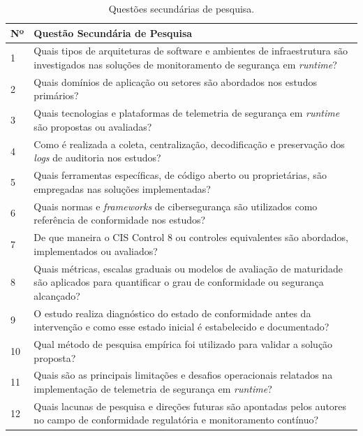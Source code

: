 \begin{table}[!htbp]
    \centering
    \caption{Questões secundárias de pesquisa.}
    \label{tab:rsl_questoes_secundarias}
    \small
    \begin{tabular}{p{1.2cm}p{13.2cm}}
        \hline
        \textbf{Nº} & \textbf{Questão Secundária de Pesquisa} \\ \hline
        1 & Quais tipos de arquiteturas de software e ambientes de infraestrutura são investigados nas soluções de monitoramento de segurança em \textit{runtime}? \\ \hline
        2 & Quais domínios de aplicação ou setores são abordados nos estudos primários? \\ \hline
        3 & Quais tecnologias e plataformas de telemetria de segurança em \textit{runtime} são propostas ou avaliadas? \\ \hline
        4 & Como é realizada a coleta, centralização, decodificação e preservação dos \textit{logs} de auditoria nos estudos? \\ \hline
        5 & Quais ferramentas específicas, de código aberto ou proprietárias, são empregadas nas soluções implementadas? \\ \hline
        6 & Quais normas e \textit{frameworks} de cibersegurança são utilizados como referência de conformidade nos estudos? \\ \hline
        7 & De que maneira o CIS Control 8 ou controles equivalentes são abordados, implementados ou avaliados? \\ \hline
        8 & Quais métricas, escalas graduais ou modelos de avaliação de maturidade são aplicados para quantificar o grau de conformidade ou segurança alcançado? \\ \hline
        9 & O estudo realiza diagnóstico do estado de conformidade antes da intervenção e como esse estado inicial é estabelecido e documentado? \\ \hline
        10 & Qual método de pesquisa empírica foi utilizado para validar a solução proposta? \\ \hline
        11 & Quais são as principais limitações e desafios operacionais relatados na implementação de telemetria de segurança em \textit{runtime}? \\ \hline
        12 & Quais lacunas de pesquisa e direções futuras são apontadas pelos autores no campo de conformidade regulatória e monitoramento contínuo? \\ \hline
    \end{tabular}
\end{table}
\FloatBarrier


